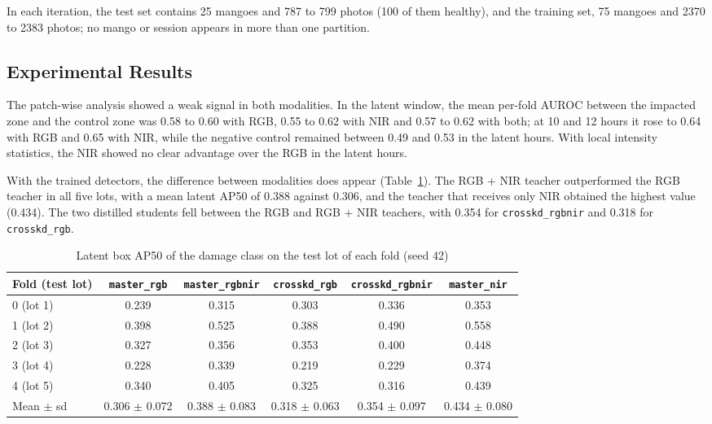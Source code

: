 \documentclass[journal]{IEEEtran}
\begin{document}
In each iteration, the test set contains 25 mangoes and 787 to 799 photos (100 of them healthy), and the training set, 75 mangoes and 2370 to 2383 photos; no mango or session appears in more than one partition.

\subsection{Experimental Results}\label{sec:res-exp}
The patch-wise analysis showed a weak signal in both modalities. In the latent window, the mean per-fold AUROC between the impacted zone and the control zone was 0.58 to 0.60 with RGB, 0.55 to 0.62 with NIR and 0.57 to 0.62 with both; at 10 and 12 hours it rose to 0.64 with RGB and 0.65 with NIR, while the negative control remained between 0.49 and 0.53 in the latent hours. With local intensity statistics, the NIR showed no clear advantage over the RGB in the latent hours.

With the trained detectors, the difference between modalities does appear (Table~\ref{tab:ap50}). The RGB + NIR teacher outperformed the RGB teacher in all five lots, with a mean latent AP50 of 0.388 against 0.306, and the teacher that receives only NIR obtained the highest value (0.434). The two distilled students fell between the RGB and RGB + NIR teachers, with 0.354 for \texttt{crosskd\_\allowbreak rgbnir} and 0.318 for \texttt{crosskd\_\allowbreak rgb}.

\begin{table}[!t]
\caption{Latent box AP50 of the damage class on the test lot of each fold (seed 42)}
\label{tab:ap50}
\centering
\footnotesize
\setlength{\tabcolsep}{6pt}
\renewcommand{\arraystretch}{1.1}
\begin{tabular}{@{}lccccc@{}}
\toprule
Fold (test lot) & \texttt{master\_\allowbreak rgb} & \texttt{master\_\allowbreak rgbnir} & \texttt{crosskd\_\allowbreak rgb} & \texttt{crosskd\_\allowbreak rgbnir} & \texttt{master\_\allowbreak nir} \\
\midrule
0 (lot 1) & 0.239 & 0.315 & 0.303 & 0.336 & 0.353 \\
1 (lot 2) & 0.398 & 0.525 & 0.388 & 0.490 & 0.558 \\
2 (lot 3) & 0.327 & 0.356 & 0.353 & 0.400 & 0.448 \\
3 (lot 4) & 0.228 & 0.339 & 0.219 & 0.229 & 0.374 \\
4 (lot 5) & 0.340 & 0.405 & 0.325 & 0.316 & 0.439 \\
\midrule
Mean $\pm$ sd & 0.306 $\pm$ 0.072 & 0.388 $\pm$ 0.083 & 0.318 $\pm$ 0.063 & 0.354 $\pm$ 0.097 & 0.434 $\pm$ 0.080 \\
\bottomrule
\end{tabular}
\end{table}
\end{document}
